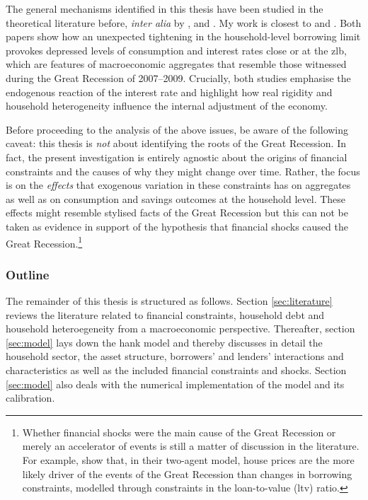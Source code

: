 \documentclass[12pt]{article} %
\numberwithin{equation}{section} %
\numberwithin{figure}{section}
\numberwithin{table}{section}
\begin{document}
The general mechanisms identified in this thesis have been studied in the theoretical literature before, \textit{inter alia} by \textcite{egg2012}, \textcite{riosrull2015} and \textcite{gl2017}. My work is closest to \textcite{egg2012} and \textcite{gl2017}. Both papers show how an unexpected tightening in the household-level borrowing limit provokes depressed levels of consumption and interest rates close or at the \Gls{zlb}, which are features of macroeconomic aggregates that resemble those witnessed during the Great Recession of 2007--2009. Crucially, both studies emphasise the endogenous reaction of the interest rate and highlight how real rigidity and household heterogeneity influence the internal adjustment of the economy.

Before proceeding to the analysis of the above issues, be aware of the following caveat: this thesis is \textit{not} about identifying the roots of the Great Recession. In fact, the present investigation is entirely agnostic about the origins of financial constraints and the causes of why they might change over time. Rather, the focus is on the \textit{effects} that exogenous variation in these constraints has on aggregates as well as on consumption and savings outcomes at the household level. These effects might resemble stylised facts of the Great Recession but this can not be taken as evidence in support of the hypothesis that financial shocks caused the Great Recession.\footnote{Whether financial shocks were the main cause of the Great Recession or merely an accelerator of events is still a matter of discussion in the literature. For example, \textcite{justiniano2015} show that, in their two-agent model, house prices are the more likely driver of the events of the Great Recession than changes in borrowing constraints, modelled through constraints in the loan-to-value (\Gls{ltv}) ratio.}

\subsubsection*{Outline}
\label{sec:outline}
The remainder of this thesis is structured as follows. Section \ref{sec:literature} reviews the literature related to financial constraints, household debt and household heteroegeneity from a macroeconomic perspective. Thereafter, section \ref{sec:model} lays down the \Gls{hank} model and thereby discusses in detail the household sector, the asset structure, borrowers' and lenders' interactions and characteristics as well as the included financial constraints and shocks. Section \ref{sec:model} also deals with the numerical implementation of the model and its calibration. 
\end{document}
